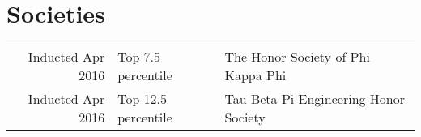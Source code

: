 \documentclass[]{deedy-resume-openfont}
\begin{document}
\begin{minipage}[t]{0.66\textwidth}

\section{Societies} 

\begin{tabular}{rll}
Inducted Apr 2016 & Top 7.5 percentile & The Honor Society of Phi Kappa Phi\\
Inducted Apr 2016 & Top 12.5 percentile & Tau Beta Pi Engineering Honor Society\\
\end{tabular}
\sectionsep

\end{minipage} 
\end{document}
